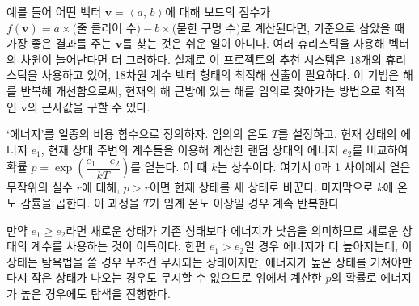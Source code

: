 예를 들어 어떤 벡터 $\mathbf{v} = \left<a,\,b\right>$에 대해 보드의 점수가
$f\left(\mathbf{v}\right) = a\times\mbox{(줄 클리어 수)} - b\times\mbox{(묻힌 구멍 수)}$로 계산된다면, 기준으로 삼았을 때 가장 좋은 결과를 주는 $\mathbf{v}$를 찾는 것은 쉬운 일이 아니다.
여러 휴리스틱을 사용해 벡터의 차원이 늘어난다면 더 그러하다. 실제로 이 프로젝트의 추천 시스템은 18개의 휴리스틱을 사용하고 있어, 18차원 계수 벡터 형태의 최적해 산출이 필요하다.
이 기법은 해를 반복해 개선함으로써, 현재의 해 근방에 있는 해를 임의로 찾아가는 방법으로 최적인 $\mathbf{v}$의 근사값을 구할 수 있다.

`에너지'를 일종의 비용 함수으로 정의하자. 임의의 온도 $T$를 설정하고, 현재 상태의 에너지 $e_1$, 현재 상태 주변의 계수들을 이용해 계산한
랜덤 상태의 에너지 $e_2$를 비교하여 확률 $p=\exp \left(\dfrac{e_1-e_2}{kT}\right)$를 얻는다.
이 때 $k$는 상수이다. 여기서 0과 1 사이에서 얻은 무작위의 실수 $r$에 대해, $p>r$이면 현재 상태를 새 상태로 바꾼다. 마지막으로 $k$에 온도 감률을 곱한다. 이 과정을 $T$가 임계 온도 이상일 경우 계속 반복한다.

만약 $e_1 \geq e_2$라면 새로운 상태가 기존 싱태보다 에너지가 낮음을 의미하므로 새로운 상태의 계수를 사용하는 것이 이득이다. 한편 $e_1 > e_2$일 경우 에너지가 더 높아지는데,
이 상태는 탐욕법을 쓸 경우 무조건 무시되는 상태이지만, 에너지가 높은 상태를 거쳐야만 다시 작은 상태가 나오는 경우도 무시할 수 없으므로
위에서 계산한 $p$의 확률로 에너지가 높은 경우에도 탐색을 진행한다.